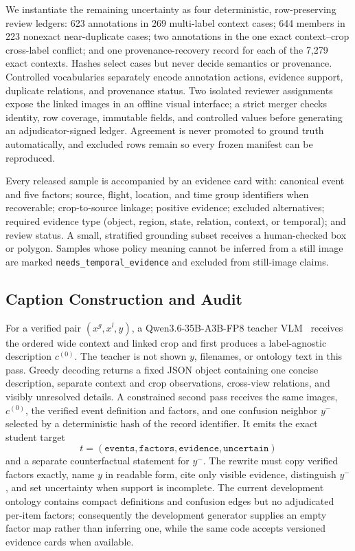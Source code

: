 We instantiate the remaining uncertainty as four deterministic, row-preserving review ledgers: 623 annotations in 269 multi-label context cases; 644 members in 223 nonexact near-duplicate cases; two annotations in the one exact context--crop cross-label conflict; and one provenance-recovery record for each of the 7,279 exact contexts. Hashes select cases but never decide semantics or provenance. Controlled vocabularies separately encode annotation actions, evidence support, duplicate relations, and provenance status. Two isolated reviewer assignments expose the linked images in an offline visual interface; a strict merger checks identity, row coverage, immutable fields, and controlled values before generating an adjudicator-signed ledger. Agreement is never promoted to ground truth automatically, and excluded rows remain so every frozen manifest can be reproduced.

Every released sample is accompanied by an evidence card with: canonical event and five factors; source, flight, location, and time group identifiers when recoverable; crop-to-source linkage; positive evidence; excluded alternatives; required evidence type (object, region, state, relation, context, or temporal); and review status. A small, stratified grounding subset receives a human-checked box or polygon. Samples whose policy meaning cannot be inferred from a still image are marked \texttt{needs\_temporal\_evidence} and excluded from still-image claims.

\subsection{Caption Construction and Audit}
\label{sec:captiondata}

For a verified pair $(x^g,x^l,y)$, a Qwen3.6-35B-A3B-FP8 teacher VLM~\cite{qwen2026qwen36} receives the ordered wide context and linked crop and first produces a label-agnostic description $c^{(0)}$. The teacher is not shown $y$, filenames, or ontology text in this pass. Greedy decoding returns a fixed JSON object containing one concise description, separate context and crop observations, cross-view relations, and visibly unresolved details. A constrained second pass receives the same images, $c^{(0)}$, the verified event definition and factors, and one confusion neighbor $y^{-}$ selected by a deterministic hash of the record identifier. It emits the exact student target
\[
  t=(\texttt{events},\texttt{factors},\texttt{evidence},\texttt{uncertain})
\]
and a separate counterfactual statement for $y^{-}$. The rewrite must copy verified factors exactly, name $y$ in readable form, cite only visible evidence, distinguish $y^{-}$, and set uncertainty when support is incomplete. The current development ontology contains compact definitions and confusion edges but no adjudicated per-item factors; consequently the development generator supplies an empty factor map rather than inferring one, while the same code accepts versioned evidence cards when available.


